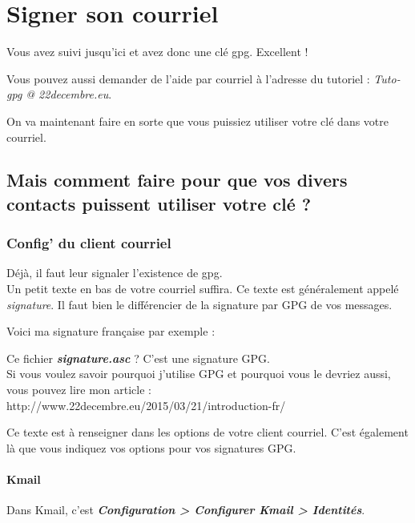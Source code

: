 \chapter{Signer son courriel}

Vous avez suivi jusqu'ici et avez donc une clé gpg. Excellent !

Vous pouvez aussi demander de l'aide par courriel à l'adresse du
tutoriel : \emph{Tuto-gpg @ 22decembre.eu}.

On va maintenant faire en sorte que vous puissiez utiliser votre clé
dans votre courriel.

\section{Mais comment faire pour que vos divers contacts puissent utiliser votre clé ?}\label{mais-comment-faire-pour-que-vos-divers-contacts-puissent-utiliser-votre-cluxe9}

\subsection{Config' du client courriel}\label{config-du-client-courriel}

Déjà, il faut leur signaler l'existence de gpg.\\Un petit texte en bas
de votre courriel suffira. Ce texte est généralement appelé
\emph{signature}. Il faut bien le différencier de la signature par GPG
de vos messages.

Voici ma signature française par exemple :

\begin{quoting}
Ce fichier \textbf{\emph{signature.asc}} ? C'est une signature GPG.\\Si
vous voulez savoir pourquoi j'utilise GPG et pourquoi vous le devriez
aussi, vous pouvez lire mon article
:\\http://www.22decembre.eu/2015/03/21/introduction-fr/
\end{quoting}

Ce texte est à renseigner dans les options de votre client courriel.
C'est également là que vous indiquez vos options pour vos signatures
GPG.

\subsubsection{Kmail}\label{kmail}

Dans Kmail, c'est \textbf{\emph{Configuration \textgreater{} Configurer
Kmail \textgreater{} Identités}}.

